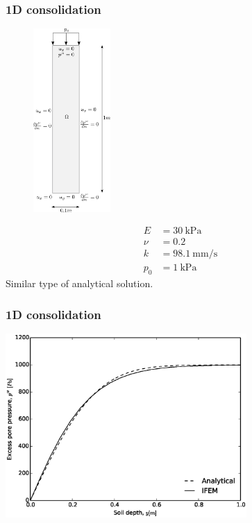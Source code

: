 \documentclass{beamer}
\begin{document}
\begin{frame}
  \frametitle{1D consolidation}

  \vspace{-3.5cm}
  \begin{figure}
  \begin{center}
    \includegraphics[height=7cm]{figs/Benchmark2}
  \end{center}
  \end{figure}
  \begin{align*}
    E &= \SI{30}{\kilo\pascal} \\
    \nu &= 0.2 \\
    k &= \SI{98.1}{\milli\meter\per\second} \\
    p_0 &= \SI{1}{\kilo\pascal}
  \end{align*}
  \hspace{6cm}Similar type of analytical solution.
\end{frame}

\begin{frame}
  \frametitle{1D consolidation}

  \begin{center}
    \includegraphics[height=7cm]{figs/OGS1D_Anasol_v_IFEM}
  \end{center}
\end{frame}
\end{document}
